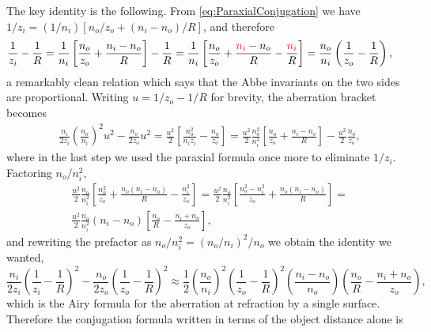                     The key identity is the following. From \ref{eq:ParaxialConjugation} we have $1/z_i = (1/n_i)\left[ n_o/z_o + (n_i-n_o)/R \right]$, and therefore
                    \begin{align*}
                        & \frac{1}{z_i} - \frac{1}{R} = \frac{1}{n_i}\left[ \frac{n_o}{z_o} + \frac{n_i-n_o}{R} \right] - \frac{1}{R} = \frac{1}{n_i}\left[ \frac{n_o}{z_o} + \frac{ {\color{red}n_i} - n_o}{R} - \frac{ {\color{red}n_i}}{R} \right] = \frac{n_o}{n_i}\left( \frac{1}{z_o} - \frac{1}{R} \right),
                    \end{align*}
                    a remarkably clean relation which says that the Abbe invariants on the two sides are proportional. Writing $u = 1/z_o-1/R$ for brevity, the aberration bracket becomes
                    \begin{align*}
                        & \frac{n_i}{2z_i}\left( \frac{n_o}{n_i} \right)^2u^2 - \frac{n_o}{2z_o}u^2 = \frac{u^2}{2}\left[ \frac{n_o^2}{n_iz_i} - \frac{n_o}{z_o} \right] = \frac{u^2}{2}\frac{n_o^2}{n_i^2}\left[ \frac{n_o}{z_o} + \frac{n_i-n_o}{R} \right] - \frac{u^2}{2}\frac{n_o}{z_o},
                    \end{align*}
                    where in the last step we used the paraxial formula once more to eliminate $1/z_i$. Factoring $n_o/n_i^2$,
                    \begin{align*}
                        & \frac{u^2}{2}\frac{n_o}{n_i^2}\left[ \frac{n_o^2}{z_o} + \frac{n_o\left(n_i-n_o\right)}{R} - \frac{n_i^2}{z_o} \right] = \frac{u^2}{2}\frac{n_o}{n_i^2}\left[ \frac{n_o^2-n_i^2}{z_o} + \frac{n_o\left(n_i-n_o\right)}{R} \right] = \\
                        & \frac{u^2}{2}\frac{n_o}{n_i^2}\left( n_i-n_o \right)\left[ \frac{n_o}{R} - \frac{n_i+n_o}{z_o} \right],
                    \end{align*}
                    and rewriting the prefactor as $n_o/n_i^2 = \left(n_o/n_i\right)^2/n_o$ we obtain the identity we wanted,
                    \begin{equation}\label{eq:AirySubstitution}
                        \frac{n_i}{2z_i}\left( \frac{1}{z_i}-\frac{1}{R} \right)^2 - \frac{n_o}{2z_o}\left( \frac{1}{z_o}-\frac{1}{R} \right)^2 \approx \frac{1}{2}\left( \frac{n_o}{n_i} \right)^2\left( \frac{1}{z_o}-\frac{1}{R} \right)^2\left( \frac{n_i-n_o}{n_o} \right)\left( \frac{n_o}{R} - \frac{n_i+n_o}{z_o} \right),
                    \end{equation}
                    which is the Airy formula for the aberration at refraction by a single surface. Therefore the conjugation formula written in terms of the object distance alone is
